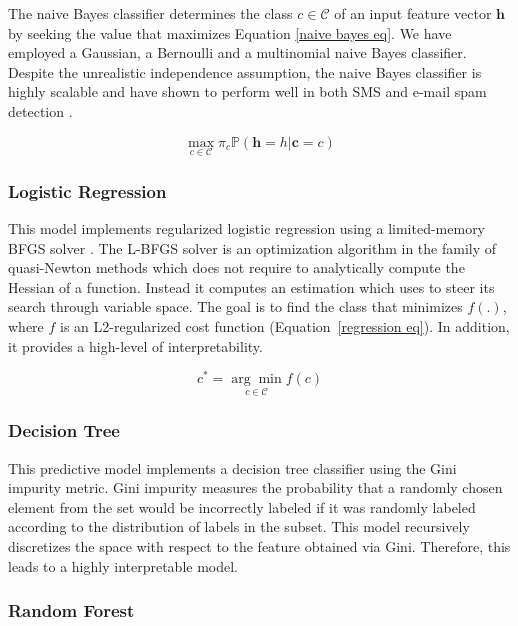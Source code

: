 \documentclass[letterpaper]{article}
\begin{document}
The naive Bayes classifier determines the class $c \in \mathcal{C}$ of an input feature vector $\mathbf{h}$ by seeking the value that maximizes Equation \ref{naive bayes eq}. We have employed a Gaussian, a Bernoulli and a multinomial naive Bayes classifier. Despite the unrealistic independence assumption, the naive Bayes classifier is highly scalable and have shown to perform well in both SMS and e-mail spam detection \cite{gomez2006content} \cite{androutsopoulos2000evaluation}.

\begin{equation} \label{naive bayes eq}
	\underset{c \in \mathcal{C}}{\max} \pi_c \mathds{P} (\mathbf{h} = h | \mathbf{c} = c)
\end{equation}

\subsubsection{Logistic Regression}  \label{Logistic Regression}

This model implements regularized logistic regression using a limited-memory BFGS solver \cite{liu1989limited}. The L-BFGS solver is an optimization algorithm in the family of quasi-Newton methods which does not require to analytically compute the Hessian of a function. Instead it computes an estimation which uses to steer its search through variable space. The goal is to find the class that minimizes $f(.)$, where $f$ is an L2-regularized cost function (Equation~\ref{regression eq}). In addition, it provides a high-level of interpretability.

\begin{equation} \label{regression eq}
	c^* = \underset{c \in \mathcal{C}}{\arg \min} f(c) 
\end{equation}

\subsubsection{Decision Tree} \label{Decision Tree}

This predictive model implements a decision tree classifier using the Gini impurity metric. Gini impurity measures the probability that a randomly chosen element from the set would be incorrectly labeled if it was randomly labeled according to the distribution of labels in the subset. This model recursively discretizes the space with respect to the feature obtained via Gini. Therefore, this leads to a highly interpretable model.

\subsubsection{Random Forest}  \label{Random Forest}
\end{document}
